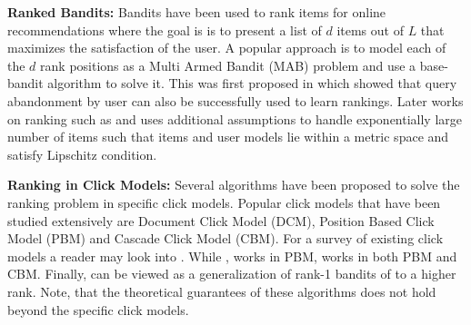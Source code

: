 
\textbf{Ranked Bandits:} Bandits have been used to rank items for online recommendations where the goal is is to present a list of $d$ items out of $L$ that maximizes the satisfaction of the user. A popular approach is to model each of the $d$ rank positions as a Multi Armed Bandit (MAB) problem and use a base-bandit algorithm to solve it. This was first proposed in \citet{radlinski2008learning} which  showed that query abandonment by user can also be successfully used to learn rankings. Later works on ranking such as \citet{slivkins2010ranked} and \citet{slivkins2013ranked} uses additional assumptions to handle  exponentially large number of items such that items and user models lie within a metric space and satisfy Lipschitz condition. 

\textbf{Ranking in Click Models:} Several algorithms have been proposed to solve the ranking problem in specific click models. Popular click models that have been studied extensively are Document Click Model (DCM), Position Based Click Model (PBM) and Cascade Click Model (CBM). For a survey of existing click models a reader may look into \citet{chuklin2015click}. While \citet{katariya2017bernoulli}, \citet{katariya2016stochastic} works in PBM, \citet{zoghi2017online} works in both PBM and CBM. Finally, \citet{kveton2017stochastic} can be viewed as a generalization of rank-1 bandits of \citet{katariya2016stochastic} to a higher rank. Note, that the theoretical guarantees of these algorithms does not hold beyond the specific click models.



